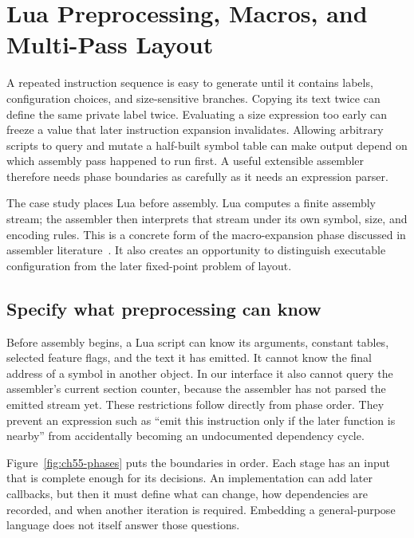 \chapter{Lua Preprocessing, Macros, and Multi-Pass Layout}
\label{ch:assembly-preprocessing}

A repeated instruction sequence is easy to generate until it contains labels, configuration choices, and size-sensitive branches.
Copying its text twice can define the same private label twice.
Evaluating a size expression too early can freeze a value that later instruction expansion invalidates.
Allowing arbitrary scripts to query and mutate a half-built symbol table can make output depend on which assembly pass happened to run first.
A useful extensible assembler therefore needs phase boundaries as carefully as it needs an expression parser.

The case study places Lua before assembly.
Lua computes a finite assembly stream; the assembler then interprets that stream under its own symbol, size, and encoding rules.
This is a concrete form of the macro-expansion phase discussed in assembler literature~\cite{salomon-1993-assemblers}.
It also creates an opportunity to distinguish executable configuration from the later fixed-point problem of layout.

\section{Specify what preprocessing can know}
\label{sec:ch55-phases}

Before assembly begins, a Lua script can know its arguments, constant tables, selected feature flags, and the text it has emitted.
It cannot know the final address of a symbol in another object.
In our interface it also cannot query the assembler's current section counter, because the assembler has not parsed the emitted stream yet.
These restrictions follow directly from phase order.
They prevent an expression such as \enquote{emit this instruction only if the later function is nearby} from accidentally becoming an undocumented dependency cycle.

Figure~\ref{fig:ch55-phases} puts the boundaries in order.
Each stage has an input that is complete enough for its decisions.
An implementation can add later callbacks, but then it must define what can change, how dependencies are recorded, and when another iteration is required.
Embedding a general-purpose language does not itself answer those questions.

